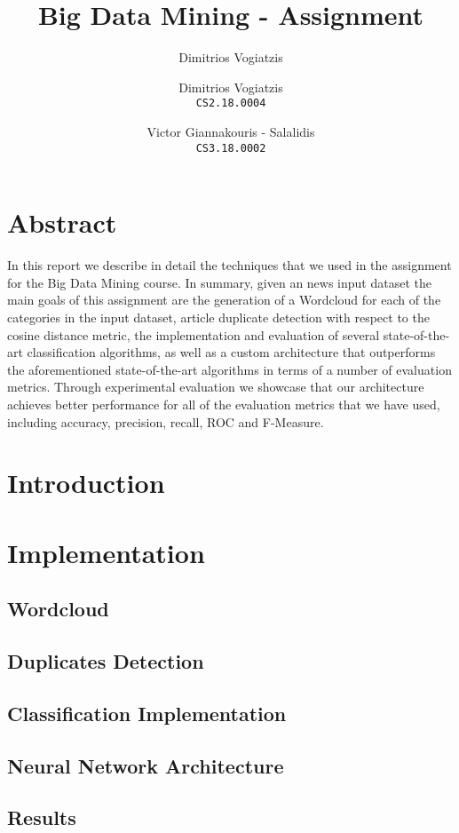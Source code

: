 \documentclass[]{article}
\title{Big Data Mining - Assignment}
\author{Dimitrios Vogiatzis}
\author{
	Dimitrios Vogiatzis\\
	\texttt{CS2.18.0004}
	\and
	Victor Giannakouris - Salalidis\\
	\texttt{CS3.18.0002}
}
\begin{document}
\date{}
\maketitle

\section{Abstract}
In this report we describe in detail the techniques that we used in the assignment for the Big Data Mining course. In summary, given an news input dataset the main goals of this assignment are the generation of a Wordcloud for each of the categories in the input dataset, article duplicate detection with respect to the cosine distance metric, the implementation and evaluation of several state-of-the-art classification algorithms, as well as a custom architecture that outperforms the aforementioned state-of-the-art algorithms in terms of a number of evaluation metrics. Through experimental evaluation we showcase that our architecture achieves better performance for all of the evaluation metrics that we have used, including accuracy, precision, recall, ROC and F-Measure.
\section{Introduction}

\section{Implementation}
\subsection{Wordcloud}

\subsection{Duplicates Detection}

\subsection{Classification Implementation}

\subsection{Neural Network Architecture}

\subsection{Results}




\end{document}
